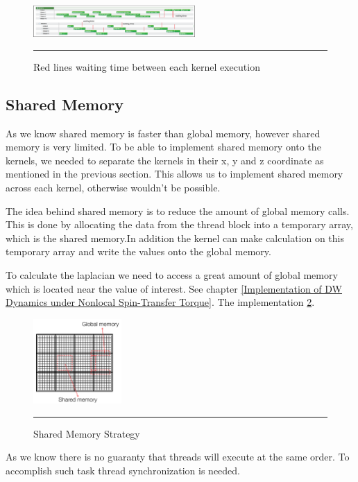 \begin{figure}[htbp]
	\centering
		\includegraphics[width=0.55\textwidth]{Figures/waittime.png}
		\rule{35em}{0.2pt}
	\caption[Waiting time concurrent kernels]{Red lines waiting time between each kernel execution
}
	\label{fig:waittime}
\end{figure}


\subsection{Shared Memory}

As we know shared memory is faster than global memory, however shared memory is very limited. To be able to implement shared memory onto the kernels, we needed to separate the kernels in their x, y and z coordinate as mentioned in the previous section. This allows us to implement shared memory across each kernel, otherwise wouldn't be possible.

The idea behind shared memory is to reduce the amount of global memory calls. This is done by allocating the data from the thread block into a temporary array, which is the shared memory.In addition the kernel can make calculation on this temporary array and write the values onto the global memory.

To calculate the laplacian we need to access a great amount of global memory which is located near the value of interest. See chapter \ref{Implementation of DW Dynamics under Nonlocal Spin-Transfer Torque}. The implementation \ref{fig:shared}.

\begin{figure}[htbp]
	\centering
		\includegraphics[width=0.3\textwidth]{Figures/shared.png}
		\rule{35em}{0.2pt}
	\caption[Shared Memory Strategy]{Shared Memory Strategy }
	\label{fig:shared}
\end{figure}


As we know there is no guaranty that threads will execute at the same order. To accomplish such task thread synchronization is needed.

